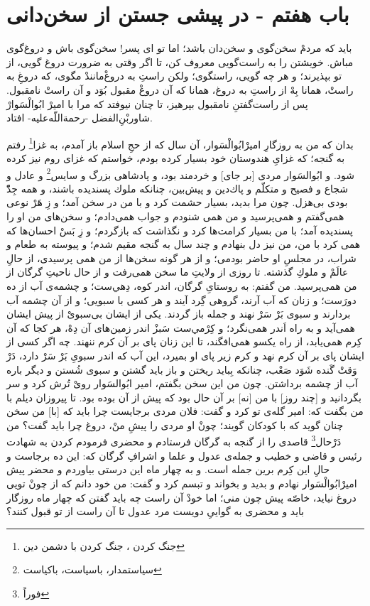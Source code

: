 \section*{باب هفتم - 
در پيشى جستن از سخن‌دانى}

بايد كه مردمْ سخن‌گوى و سخن‌دان باشد؛ اما تو اى پسر! سخن‌گوى باش و دروغ‌گوى مباش. خويشتن را به راست‌گويى معروف كن، تا اگر وقتى به ضرورت دروغ گويى، از تو بپذيرند؛ و هر چه گويى، راستگوى؛ ولكن راستِ به دروغْ‌مانندْ مگوى، كه دروغِ به راستْ، همانا بِهْ از راستِ به دروغ، همانا كه آن دروغْ مقبول بُوَد و آن راستْ نامقبول. پس از راست‌گفتنِ نامقبول بپرهيز، تا چنان نيوفتد كه مرا با اميرْ ابُوالْسَوارْ شاوربْن‌ِالفضل -رحمةاللّه‌عليه- افتاد.


بدان كه من به روزگارِ اميرْابُوالْسَوار، آن سال كه از حجِ اسلام باز آمدم، به غزا\footnote{ جنگ کردن ، جنگ کردن با دشمن دین}
 رفتم به گنجه؛ كه غزاىِ هندوستان خود بسيار كرده بودم، خواستم كه غزاى روم نيز كرده شود. و ابُوالسَوار مردى [بر جاى] و خردمند بود، و پادشاهى بزرگ و سايس\footnote{سیاستمدار، باسیاست، باکیاست}
 و عادل و شجاع و فصيح و متكلّم و پاك‌دين و پيش‌بين، چنانكه ملوك پسنديده باشند، و همه جِدّْ بودى بى‌هزل. چون مرا بديد، بسيار حشمت كرد و با من در سخن آمد؛ و زِ هَرْ نوعى همى‌گفتم و همى‌پرسيد و من همى شنودم و جواب همى‌دادم؛ و سخن‌هاى من او را پسنديده آمد؛ با من بسيار كرامت‌ها كرد و نگذاشت كه بازگردم؛ و زِ بَسْ احسان‌ها كه همى كرد با من، من نيز دل بنهادم و چند سال به گنجه مقيم شدم؛ و پيوسته به طعام و شراب، در مجلسِ او حاضر بودمى؛ و از هر گونه سخن‌ها از من همى پرسيدى، از حالِ عالَمْ و ملوكِ گذشته. تا روزى از ولايتِ ما سخن همى‌رفت و از حال ناحيتِ گرگان از من همى‌پرسيد. من گفتم: به روستاىِ گرگان، اندر كوه، دِهي‌ست؛ و چشمه‌ی آب از ده دورَست؛ و زنان كه آب آرند، گروهى گِرد آيند و هر كسى با سبويى؛ و از آن چشمه آب بردارند و سبوى بَرْ سَرْ نهند و جمله باز گردند. يكى از ايشان بى‌سبوىْ از پيش ايشان همى‌آيد و به راه اَندر همى‌نگرد؛ و كِرْمي‌ست سَبزْ اندر زمين‌هاى آن دِهْ، هر كجا كه آن كِرم همى‌يابد، از راه يكسو همى‌افگند، تا اين زنان پاى بر آن كرم ننهند. چه اگر كسى از ايشان پاى بر آن كرم نهد و كرم زير پاى او بميرد، اين آب كه اندر سبوىِ بَرْ سَرْ دارد، دَرْ وَقتْ گَنده شَوَد صَعْب، چنانكه بِبايد ريختن و باز بايد گشتن و سبوى شُستن و ديگر باره آب از چشمه برداشتن. چون من اين سخن بگفتم، امير ابُوالسَوار روىْ تُرش كرد و سر بگردانيد و [چند روز] با من [نه] بر آن حال بود كه پيش از آن بوده بود. تا پيروزان ديلم با من بگفت كه: امير گله‌ی تو كرد و گفت: فلان مردى برجايست چرا بايد كه [با] من سخن چنان گويد كه با كودكان گويند؛ چونْ او مردى را پيشِ منْ، دروغ چرا بايد گفت‌؟ من دَرْحال\footnote{فوراً} قاصدى را از گنجه به گرگان فرستادم و محضرى فرمودم كردن به شهادت رئيس و قاضى و خطيب و جمله‌ی عدول و علما و اشرافِ گرگان كه: اين ده برجاست و حالِ اين كِرم برين جمله است. و به چهار ماه اين درستى بياوردم و محضر پيش اميرْابُوالْسَوار نهادم و بديد و بخواند و تبسم كرد و گفت: من خود دانم كه از چونْ تويى دروغ نيايد، خاصّه پيش چون منى؛ اما خودْ آن راست چه بايد گفتن كه چهار ماه روزگار بايد و محضرى به گوايىِ دويست مرد عدول تا آن راست از تو قبول كنند؟ 
 
